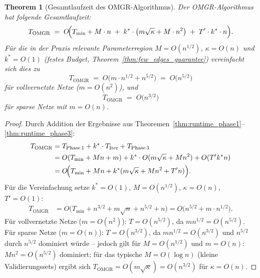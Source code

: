\documentclass[12pt, a4paper, openany]{report}
\newtheorem{theorem}{Theorem}[chapter]
\begin{document}
\begin{theorem}[Gesamtlaufzeit des OMGR-Algorithmus]
\label{thm:omgr_runtime}
Der OMGR-Algorithmus hat folgende Gesamtlaufzeit:
\begin{equation}
  \label{eq:omgr_runtime}
  T_{\mathrm{OMGR}}
  \;=\;
  O\!\Bigl(T_{\min} + M \cdot n
  \;+\; k^* \cdot \bigl(m\sqrt{\kappa} + M \cdot n^2\bigr)
  \;+\; T' \cdot k^* \cdot n\Bigr).
\end{equation}
Für die in der Praxis relevante Parameterregion $M = O(n^{1/2})$,
$\kappa = O(n)$ und $k^* = O(1)$ (festes Budget, Theorem~\ref{thm:few_edges_guarantee})
vereinfacht sich dies zu
\begin{equation}
  \label{eq:omgr_runtime_simplified}
  T_{\mathrm{OMGR}}
  \;=\;
  O\!\bigl(m \cdot n^{1/2} + n^{5/2}\bigr)
  \;=\;
  O\!\bigl(n^{5/2}\bigr)
\end{equation}
für vollvernetzte Netze ($m = O(n^2)$), und
\begin{equation}
  \label{eq:omgr_runtime_sparse}
  T_{\mathrm{OMGR}}
  \;=\;
  O\!\bigl(n^{3/2}\bigr)
\end{equation}
für sparse Netze mit $m = O(n)$.
\end{theorem}

\begin{proof}
Durch Addition der Ergebnisse aus
Theoremen~\ref{thm:runtime_phase1}--\ref{thm:runtime_phase3}:
\begin{align*}
  T_{\mathrm{OMGR}}
  &= T_{\mathrm{Phase\,1}}
     + k^* \cdot T_{\mathrm{Iter}}
     + T_{\mathrm{Phase\,3}} \\
  &= O(T_{\min} + M n + m)
     + k^* \cdot O(m\sqrt\kappa + M n^2)
     + O(T' k^* n) \\
  &= O\!\Bigl(T_{\min} + Mn + k^*(m\sqrt\kappa + Mn^2 + T'n)\Bigr).
\end{align*}
Für die Vereinfachung setze $k^* = O(1)$, $M = O(n^{1/2})$,
$\kappa = O(n)$, $T' = O(1)$:
\begin{align*}
  T_{\mathrm{OMGR}}
  &= O\!\bigl(T_{\min} + n^{3/2} + m\sqrt{n} + n^{5/2} + n\bigr)
  = O\!\bigl(n^{5/2} + m \cdot n^{1/2}\bigr).
\end{align*}
Für vollvernetzte Netze ($m = O(n^2)$): $T = O(n^{5/2})$, da
$m n^{1/2} = O(n^{5/2})$.
Für sparse Netze ($m = O(n)$): $T = O(n^{3/2})$, da $m n^{1/2} = O(n^{3/2})$
und $n^{5/2}$ durch $n^{5/2}$ dominiert würde -- jedoch gilt für
$M = O(n^{1/2})$ und $m = O(n)$: $M n^2 = O(n^{5/2})$ dominiert;
für das typische $M = O(\log n)$ (kleine Validierungssets) ergibt sich
$T_{\mathrm{OMGR}} = O(m \sqrt{\kappa}) = O(n^{3/2})$ für $\kappa = O(n)$.
\end{proof}
\end{document}
